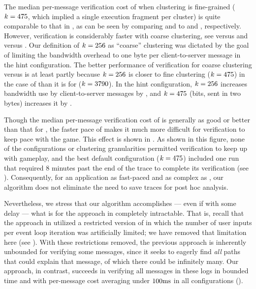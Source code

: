 The median per-message verification cost of \xpilot when clustering is
fine-grained ($k = 475$, which implied a
single execution fragment per cluster) is quite comparable to that in
\tetrinet, as can be seen by comparing
 and
 to
 and
, respectively.  However, \xpilot
verification is considerably faster with coarse clustering, see
 versus
 and
 versus
.  Our definition of $k
= 256$ as ``coarse'' clustering was dictated by the
goal of limiting the bandwidth overhead to one byte per
client-to-server message in the hint configuration.  The better
performance of \xpilot verification for coarse clustering versus
\tetrinet is at least partly because $k = 256$ is closer to
fine clustering ($k = 475$) in the case of
\xpilot than it is for \tetrinet ($k = 3790$).
In the hint configuration, $k = 256$ increases
bandwidth use by \xpilot client-to-server messages by
\xpilotCoarseBandwidthPerc, and $k = 475$
(\logXpilotFineClusterCount bits, sent in two bytes) increases it by
\xpilotFineBandwidthPerc.

Though the median per-message verification cost of \xpilot is
generally as good or better than that for \tetrinet, the faster pace
of \xpilot makes it much more difficult for verification to keep pace
with the game.  This effect is shown in .  As
shown in this figure, none of the configurations or clustering
granularities permitted verification to keep up with gameplay, and 
the best default configuration ($k = 475$)
included one run that required $8$ minutes past the end of the trace to
complete its verification (see
).  Consequently, for an
application as fast-paced and as complex as
\xpilot, our algorithm does not eliminate the need to save
traces for post hoc analysis.

Nevertheless, we stress that our algorithm accomplishes --- even if
with some delay --- what is for the approach in 
completely intractable.  That is, recall
that the approach in  utilized a restricted version of \xpilot in which the
number of user inputs per event loop iteration was artificially
limited; we have removed that limitation here (see
).  With these restrictions removed, the
previous approach is inherently unbounded for verifying some
messages, since it seeks to eagerly find \textit{all} paths that could
explain that message, of which there could be infinitely many.  Our
approach, in contrast, succeeds in verifying all messages in these
logs in bounded time and with per-message cost averaging under
$100\mathrm{ms}$ in all configurations ().

